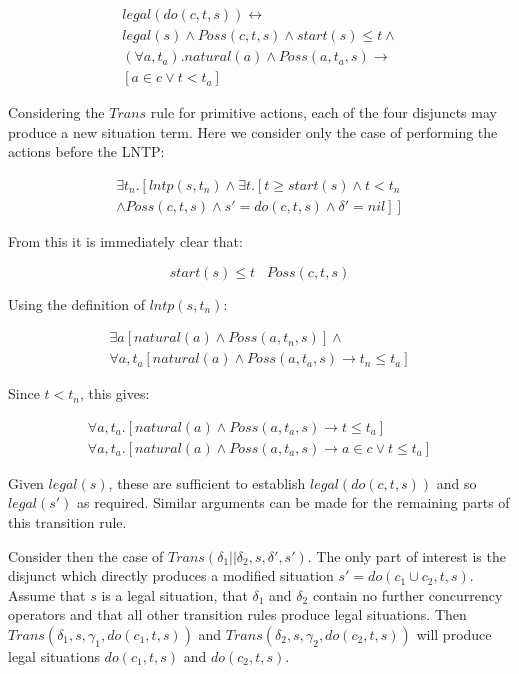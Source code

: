 \documentclass[letterpaper]{article}
\begin{document}
\[
\begin{array}{c}
legal(do(c,t,s))\leftrightarrow\\
legal(s)\wedge Poss(c,t,s)\wedge start(s)\leq t\wedge\\
(\forall a,t_{a}).natural(a)\wedge Poss(a,t_{a},s)\rightarrow\\
\left[a\in c\vee t<t_{a}\right]\end{array}\]


Considering the $Trans$ rule for primitive actions, each of the four
disjuncts may produce a new situation term. Here we consider only
the case of performing the actions before the LNTP:

\[
\begin{array}{c}
\exists t_{n}.\left[lntp(s,t_{n})\wedge\exists t.\left[t\geq start(s)\wedge t<t_{n}\right.\right.\\
\left.\left.\wedge Poss(c,t,s)\wedge s'=do(c,t,s)\wedge\delta'=nil\right]\right]\end{array}\]


From this it is immediately clear that:

\[
start(s)\leq t\,\,\,\,\, Poss(c,t,s)\]


Using the definition of $lntp(s,t_{n})$:

\[
\begin{array}{c}
\exists a\left[natural(a)\wedge Poss(a,t_{n},s)\right]\wedge\\
\forall a,t_{a}\left[natural(a)\wedge Poss(a,t_{a},s)\rightarrow t_{n}\leq t_{a}\right]\end{array}\]


Since $t<t_{n}$, this gives:

\[
\begin{array}{c}
\forall a,t_{a}.\left[natural(a)\wedge Poss(a,t_{a},s)\rightarrow t\leq t_{a}\right]\\
\forall a,t_{a}.\left[natural(a)\wedge Poss(a,t_{a},s)\rightarrow a\in c\vee t\leq t_{a}\right]\end{array}\]


Given $legal(s)$, these are sufficient to establish $legal(do(c,t,s))$
and so $legal(s')$ as required. Similar arguments can be made for
the remaining parts of this transition rule.

Consider then the case of $Trans(\delta_{1}||\delta_{2},s,\delta',s')$.
The only part of interest is the disjunct which directly produces
a modified situation $s'=do(c_{1}\cup c_{2},t,s)$. Assume that $s$
is a legal situation, that $\delta_{1}$ and $\delta_{2}$ contain
no further concurrency operators and that all other transition rules
produce legal situations. Then $Trans(\delta_{1},s,\gamma_{1},do(c_{1},t,s))$
and $Trans(\delta_{2},s,\gamma_{2},do(c_{2},t,s))$ will produce legal
situations $do(c_{1},t,s)$ and $do(c_{2},t,s)$.
\end{document}
